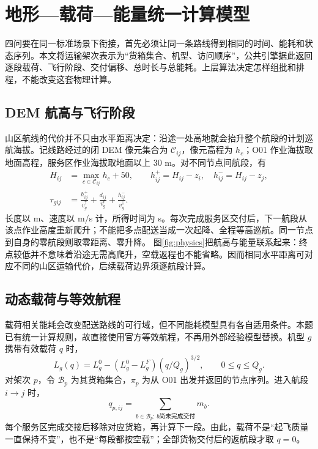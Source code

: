 \section{地形—载荷—能量统一计算模型}\label{sec:physics}
四问要在同一标准场景下衔接，首先必须让同一条路线得到相同的时间、能耗和状态序列。本文将运输架次表示为“货箱集合、机型、访问顺序”，公共引擎据此返回逐段载荷、飞行阶段、交付偏移、总时长与总能耗。上层算法决定怎样组批和排程，不能改变这套物理计算。

\subsection{DEM 航高与飞行阶段}
山区航线的代价并不只由水平距离决定：沿途一处高地就会抬升整个航段的计划巡航海拔。记线路经过的闭 DEM 像元集合为 $\mathcal C_{ij}$，像元高程为 $h_c$；O01 作业海拔取地面高程，服务区作业海拔取地面以上 30 m。对不同节点间航段，有
\begin{align}
H_{ij}&=\max_{c\in\mathcal C_{ij}}h_c+50,\qquad
h^+_{ij}=H_{ij}-z_i,\quad h^-_{ij}=H_{ij}-z_j,\label{eq:altitude}\\
\tau_{gij}&=\frac{h^+_{ij}}{v_g^\uparrow}+\frac{d_{ij}}{v_g^c}+\frac{h^-_{ij}}{v_g^\downarrow}.\label{eq:flight}
\end{align}
长度以 m、速度以 m/s 计，所得时间为 s。每次完成服务区交付后，下一航段从该点作业高度重新爬升；不能把多点配送当成一次起降、全程等高巡航。同一节点到自身的零航段则取零距离、零升降。
图\ref{fig:physics}把航高与能量联系起来：终点较低并不意味着沿途无需高爬升，空载返程也不能省略。因而相同水平距离可对应不同的山区运输代价，后续载荷边界须逐航段计算。

\subsection{动态载荷与等效航程}
载荷相关能耗会改变配送路线的可行域\cite{dorling}，但不同能耗模型具有各自适用条件\cite{zhang}。本题已有统一计算规则，故直接使用官方等效航程，不再用外部经验模型替换。机型 $g$ 携带有效载荷 $q$ 时，
\begin{equation}
L_g(q)=L_g^0-(L_g^0-L_g^F)(q/Q_g)^{3/2},\qquad 0\le q\le Q_g.\label{eq:range}
\end{equation}
对架次 $p$，令 $\mathcal B_p$ 为其货箱集合，$\pi_p$ 为从 O01 出发并返回的节点序列。进入航段 $i\to j$ 时，
\begin{equation}
q_{p,ij}=\sum_{b\in\mathcal B_p:\,b\text{尚未完成交付}}m_b.\label{eq:payloadstate}
\end{equation}
每个服务区完成交接后移除对应货箱，再计算下一段。由此，载荷不是“起飞质量一直保持不变”，也不是“每段都按空载”；全部货物交付后的返航段才取 $q=0$。

